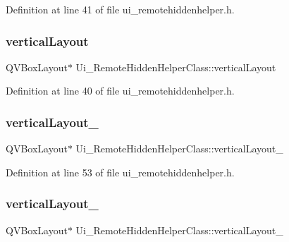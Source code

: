 Definition at line 41 of file ui\+\_\+remotehiddenhelper.\+h.

\hypertarget{class_ui___remote_hidden_helper_class_af7ac92efd58256c9c12cc70d34642b73}{}\label{class_ui___remote_hidden_helper_class_af7ac92efd58256c9c12cc70d34642b73} 
\subsubsection{\texorpdfstring{vertical\+Layout}{verticalLayout}}
{\footnotesize\ttfamily Q\+V\+Box\+Layout$\ast$ Ui\+\_\+\+Remote\+Hidden\+Helper\+Class\+::vertical\+Layout}



Definition at line 40 of file ui\+\_\+remotehiddenhelper.\+h.

\hypertarget{class_ui___remote_hidden_helper_class_a1060db6b11dc90b7cd55a0171d4a1f9d}{}\label{class_ui___remote_hidden_helper_class_a1060db6b11dc90b7cd55a0171d4a1f9d} 
\subsubsection{\texorpdfstring{vertical\+Layout\+\_}{verticalLayout\_11}}
{\footnotesize\ttfamily Q\+V\+Box\+Layout$\ast$ Ui\+\_\+\+Remote\+Hidden\+Helper\+Class\+::vertical\+Layout\+\_}



Definition at line 53 of file ui\+\_\+remotehiddenhelper.\+h.

\hypertarget{class_ui___remote_hidden_helper_class_aa49b047e44f29fe1c496137febfec9f2}{}\label{class_ui___remote_hidden_helper_class_aa49b047e44f29fe1c496137febfec9f2} 
\subsubsection{\texorpdfstring{vertical\+Layout\+\_}{verticalLayout\_12}}
{\footnotesize\ttfamily Q\+V\+Box\+Layout$\ast$ Ui\+\_\+\+Remote\+Hidden\+Helper\+Class\+::vertical\+Layout\+\_}



